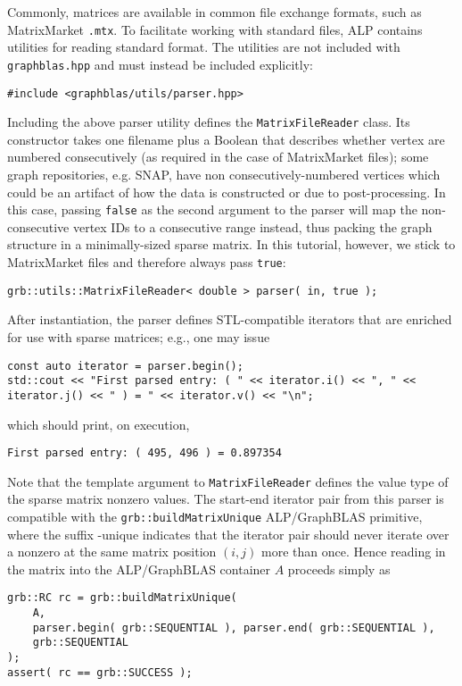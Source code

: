 Commonly, matrices are available in common file exchange formats, such as MatrixMarket \texttt{.mtx}. To facilitate working with standard files, ALP contains utilities for reading standard format. The utilities are not included with \texttt{graphblas.hpp} and must instead be included explicitly:
\begin{lstlisting}
#include <graphblas/utils/parser.hpp>
\end{lstlisting}
Including the above parser utility defines the \texttt{MatrixFileReader} class. Its constructor takes one filename plus a Boolean that describes whether vertex are numbered consecutively (as required in the case of MatrixMarket files); some graph repositories, e.g. SNAP, have non consecutively-numbered vertices which could be an artifact of how the data is constructed or due to post-processing. In this case, passing \texttt{false} as the second argument to the parser will map the non-consecutive vertex IDs to a consecutive range instead, thus packing the graph structure in a minimally-sized sparse matrix. In this tutorial, however, we stick to MatrixMarket files and therefore always pass \texttt{true}:
\begin{lstlisting}
grb::utils::MatrixFileReader< double > parser( in, true );
\end{lstlisting}
After instantiation, the parser defines STL-compatible iterators that are enriched for use with sparse matrices; e.g., one may issue
\begin{lstlisting}
const auto iterator = parser.begin();
std::cout << "First parsed entry: ( " << iterator.i() << ", " << iterator.j() << " ) = " << iterator.v() << "\n";
\end{lstlisting}
which should print, on execution,
\begin{lstlisting}
First parsed entry: ( 495, 496 ) = 0.897354
\end{lstlisting}
Note that the template argument to \texttt{MatrixFileReader} defines the value type of the sparse matrix nonzero values. The start-end iterator pair from this parser is compatible with the \texttt{grb::buildMatrixUnique} ALP/GraphBLAS primitive, where the suffix -unique indicates that the iterator pair should never iterate over a nonzero at the same matrix position $(i,j)$ more than once. Hence reading in the matrix into the ALP/GraphBLAS container $A$ proceeds simply as
\begin{lstlisting}
grb::RC rc = grb::buildMatrixUnique(
    A,
    parser.begin( grb::SEQUENTIAL ), parser.end( grb::SEQUENTIAL ),
    grb::SEQUENTIAL
);
assert( rc == grb::SUCCESS );
\end{lstlisting}

